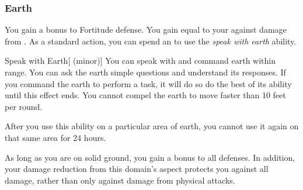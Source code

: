         \subsubsection{Earth}
             You gain a  bonus to Fortitude defense.
             You gain  equal to your  against damage from .
             As a standard action, you can spend an  to use the \textit{speak with earth} ability.
            \begin{ability}{Speak with Earth}[ (minor)]
                You can speak with and command earth within \rnglong range.
                You can ask the earth simple questions and understand its responses.
                If you command the earth to perform a task, it will do so do the best of its ability until this effect ends.
                You cannot compel the earth to move faster than 10 feet per round.

                After you use this ability on a particular area of earth, you cannot use it again on that same area for 24 hours.
            \end{ability}
             As long as you are on solid ground, you gain a  bonus to all defenses.
            In addition, your damage reduction from this domain's aspect protects you against all damage, rather than only against damage from physical attacks.

